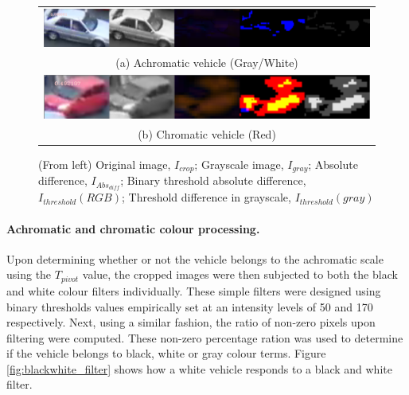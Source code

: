\begin{figure}[htb!]
  \centering
\begin{tabular}{c}
 \includegraphics[width=0.9\linewidth]{image/general/achromatic_threshold5.PNG} \\
 (a) Achromatic vehicle (Gray/White) \\
 \includegraphics[width=0.9\linewidth]{image/general/achromatic_threshold_color2.PNG}\\
(b) Chromatic vehicle (Red)
\end{tabular}
\caption{(From left) Original image, $I_{crop}$; Grayscale image, $I_{gray}$; Absolute difference, $I_{Abs_{diff}}$; Binary threshold absolute difference, $I_{threshold}(RGB)$; Threshold difference in grayscale, $I_{threshold}(gray)$} \label{fig:achromatic_thresh}
\end{figure}



\paragraph{Achromatic and chromatic colour processing.} Upon determining whether or not the vehicle belongs to the achromatic scale using the $T_{pivot}$ value, the cropped images were then subjected to both the black and white colour filters individually. These simple filters were designed using binary thresholds values empirically set at an intensity levels of 50 and 170 respectively. Next, using a similar fashion, the ratio of non-zero pixels upon filtering were computed. These non-zero percentage ration was used to determine if the vehicle belongs to black, white or gray colour terms. Figure \ref{fig:blackwhite_filter} shows how a white vehicle responds to a black and white filter.


